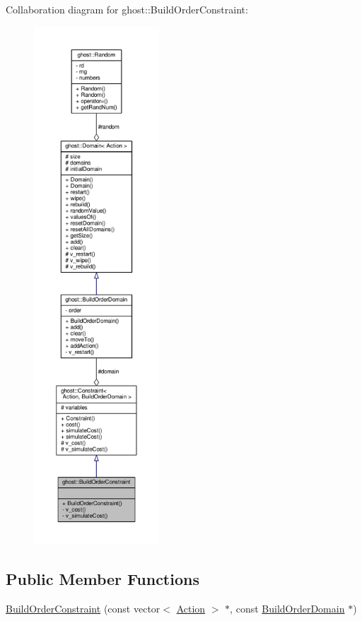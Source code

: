 Collaboration diagram for ghost\-:\-:Build\-Order\-Constraint\-:
\nopagebreak
\begin{figure}[H]
\begin{center}
\leavevmode
\includegraphics[height=550pt]{classghost_1_1BuildOrderConstraint__coll__graph}
\end{center}
\end{figure}
\subsection*{Public Member Functions}
\begin{DoxyCompactItemize}
\item 
\hyperlink{classghost_1_1BuildOrderConstraint_af68622d82e3760efc0b2b2cc37fccabe}{Build\-Order\-Constraint} (const vector$<$ \hyperlink{classghost_1_1Action}{Action} $>$ $\ast$, const \hyperlink{classghost_1_1BuildOrderDomain}{Build\-Order\-Domain} $\ast$)
\end{DoxyCompactItemize}
